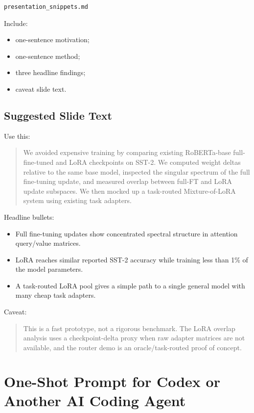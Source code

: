 \documentclass[11pt]{article}
\begin{document}
\begin{lstlisting}
presentation_snippets.md
\end{lstlisting}

Include:

\begin{itemize}[leftmargin=*]
    \item one-sentence motivation;
    \item one-sentence method;
    \item three headline findings;
    \item caveat slide text.
\end{itemize}

\subsection{Suggested Slide Text}

Use this:

\begin{quote}
We avoided expensive training by comparing existing RoBERTa-base full-fine-tuned and LoRA checkpoints on SST-2. We computed weight deltas relative to the same base model, inspected the singular spectrum of the full fine-tuning update, and measured overlap between full-FT and LoRA update subspaces. We then mocked up a task-routed Mixture-of-LoRA system using existing task adapters.
\end{quote}

Headline bullets:

\begin{itemize}[leftmargin=*]
    \item Full fine-tuning updates show concentrated spectral structure in attention query/value matrices.
    \item LoRA reaches similar reported SST-2 accuracy while training less than 1\% of the model parameters.
    \item A task-routed LoRA pool gives a simple path to a single general model with many cheap task adapters.
\end{itemize}

Caveat:

\begin{quote}
This is a fast prototype, not a rigorous benchmark. The LoRA overlap analysis uses a checkpoint-delta proxy when raw adapter matrices are not available, and the router demo is an oracle/task-routed proof of concept.
\end{quote}

\section{One-Shot Prompt for Codex or Another AI Coding Agent}
\end{document}
